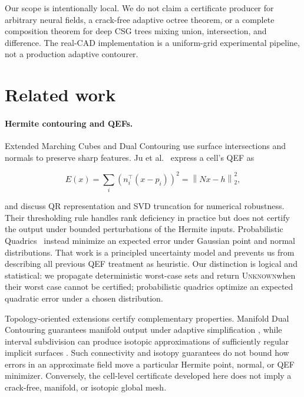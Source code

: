 \documentclass[11pt]{article}
\theoremstyle{definition}
\newcommand{\norm}[1]{\left\lVert#1\right\rVert}
\newcommand{\Unknown}{\textsc{Unknown}}
\begin{document}
Our scope is intentionally local.  We do not claim a certificate producer for
arbitrary neural fields, a crack-free adaptive octree theorem, or a complete
composition theorem for deep CSG trees mixing union, intersection, and
difference.  The real-CAD implementation is a uniform-grid experimental
pipeline, not a production adaptive contourer.

\section{Related work}

\paragraph{Hermite contouring and QEFs.}
Extended Marching Cubes and Dual Contouring use surface intersections and
normals to preserve sharp features.  Ju et al.~\cite{ju2002dual} express a
cell's QEF as

\[
E(x)=\sum_i(n_i^\top(x-p_i))^2=\norm{Nx-h}_2^2,
\]

and discuss QR representation and SVD truncation for numerical robustness.
Their thresholding rule handles rank deficiency in practice but does not
certify the output under bounded perturbations of the Hermite inputs.
Probabilistic Quadrics~\cite{trettner2020probabilistic} instead minimize an
expected error under Gaussian point and normal distributions.  That work is a
principled uncertainty model and prevents us from describing all previous
QEF treatment as heuristic.  Our distinction is logical and statistical:
we propagate deterministic worst-case sets and return \Unknown when their
worst case cannot be certified; probabilistic quadrics optimize an expected
quadratic error under a chosen distribution.

Topology-oriented extensions certify complementary properties.  Manifold Dual
Contouring guarantees manifold output under adaptive simplification
\cite{schaefer2007manifold}, while interval subdivision can produce isotopic
approximations of sufficiently regular implicit surfaces
\cite{plantinga2004isotopic}.  Such connectivity and isotopy guarantees do not
bound how errors in an approximate field move a particular Hermite point,
normal, or QEF minimizer.  Conversely, the cell-level certificate developed
here does not imply a crack-free, manifold, or isotopic global mesh.
\end{document}
